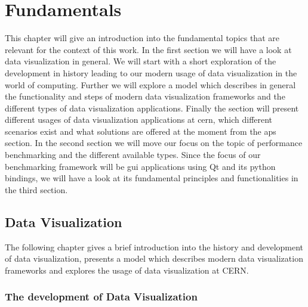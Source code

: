 
\chapter{Fundamentals}
\label{ch:fundamentals}

This chapter will give an introduction into the fundamental topics that are
relevant for the context of this work. In the first section we will have a look
at data visualization in general. We will start with a short exploration of the
development in history leading to our modern usage of data visualization in the
world of computing. Further we will explore a model which describes in general
the functionality and steps of modern data visualization frameworks and the
different types of data visualization applications. Finally the section will
present different usages of data visualization applications at \gls{cern}, which
different scenarios exist and what solutions are offered at the moment from the
\gls{aps} section. In the second section we will move our focus on the topic of
performance benchmarking and the different available types. Since the focus of
our benchmarking framework will be \gls{gui} applications using Qt and its
python bindings, we will have a look at its fundamental principles and
functionalities in the third section. 




\section{Data Visualization}
\label{sec:fundamentals:charting}

The following chapter gives a brief introduction into the history and
development of data visualization, presents a model which describes modern data
visualization frameworks and explores the usage of data visualization at CERN.



\subsection{The development of Data Visualization}
\label{sec:fundamentals:charting:history}

